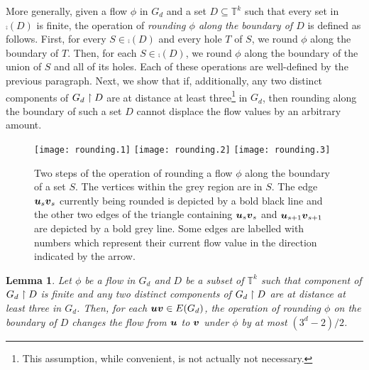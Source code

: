 \documentclass[12pt,a4paper]{amsart}
\numberwithin{equation}{section}
\newtheorem{lemma}[equation]{Lemma}
\theoremstyle{definition}
\begin{document}
More generally, given a flow $\phi$ in $G_d$ and a set $D\subseteq \mathbb{T}^k$ such that every set in $\comp(D)$ is finite, the operation of \emph{rounding $\phi$ along the boundary of $D$} is defined as follows. First, for every $S\in \comp(D)$ and every hole $T$ of $S$, we round $\phi$ along the boundary of $T$. Then, for each $S\in\comp(D)$, we round $\phi$ along the boundary of the union of $S$ and all of its holes. Each of these operations are well-defined by the previous paragraph. Next, we show that if, additionally, any two distinct components of $G_d\upharpoonright D$ are at distance at least three\footnote{This assumption, while convenient, is not actually not necessary.} in $G_d$, then rounding along the boundary of such a set $D$ cannot displace the flow values by an arbitrary amount.


\begin{figure}[htbp]
\begin{center}
\texttt{[image: rounding.1]}
\hspace{1cm}
\texttt{[image: rounding.2]}
\hspace{1cm}
\texttt{[image: rounding.3]}
\end{center}
\caption{Two steps of the operation of rounding a flow $\phi$ along the boundary  of a set $S$. The vertices within the grey region are in $S$. The edge $\boldsymbol{u}_s\boldsymbol{v}_s$ currently being rounded is depicted by a bold black line and the other two edges of the triangle containing $\boldsymbol{u}_s\boldsymbol{v}_s$ and $\boldsymbol{u}_{s+1}\boldsymbol{v}_{s+1}$ are depicted by a bold grey line. Some edges are labelled with numbers which represent their current flow value in the direction indicated by the arrow.}
\label{fig:rounding}
\end{figure}

\begin{lemma}
\label{lem:boundary3d}
Let $\phi$ be a flow in $G_d$ and $D$ be a subset of $\mathbb{T}^k$ such that component of $G_d\upharpoonright D$ is finite and any two distinct components of $G_d\upharpoonright D$ are at distance at least three in $G_d$. Then, for each $\boldsymbol{u}\boldsymbol{v}\in E(G_d)$, the operation of rounding $\phi$ on the boundary of $D$ changes the flow from $\boldsymbol{u}$ to $\boldsymbol{v}$ under $\phi$ by at most $(3^d-2)/2$. 
\end{lemma}
\end{document}
